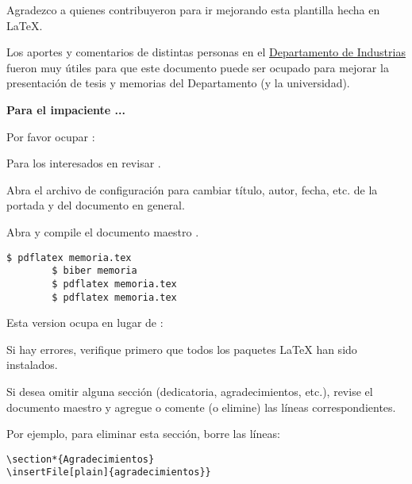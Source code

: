 
	Agradezco a quienes contribuyeron para ir mejorando esta plantilla hecha en \LaTeX{}. 
    
    Los aportes y comentarios de distintas personas en el \href{http://www.industrias.usm.cl}{Departamento de Industrias} fueron muy útiles para que este documento puede ser ocupado para mejorar la presentación de tesis y memorias del Departamento (y la universidad).
    
\vspace{20mm}
\begin{framed}
\noindent\textbf{\color{red}Para el impaciente ...}

Por favor ocupar :


Para los interesados en  revisar \parencite{Benoit2018}.

Abra el archivo de configuración  para cambiar título, autor, fecha, etc. de la portada y del documento en general.

Abra  y compile el documento maestro .

\begin{Verbatim}[fontsize=\small]
        $ pdflatex memoria.tex
        $ biber memoria
        $ pdflatex memoria.tex
        $ pdflatex memoria.tex
\end{Verbatim}

Esta version ocupa  en lugar de :

Si hay errores, verifique primero que todos los paquetes \LaTeX{} han sido instalados.

Si desea omitir alguna sección (dedicatoria, agradecimientos, etc.), revise el documento maestro  y agregue o comente (o elimine) las líneas correspondientes.

Por ejemplo, para eliminar esta sección, borre las líneas:

\begin{Verbatim}[frame=lines, label=\inlinecode{memoria.tex} (extracto)
, fontsize=\footnotesize
, baselinestretch=1
, formatcom=\color{gray}]
\section*{Agradecimientos}
\insertFile[plain]{agradecimientos}}
\end{Verbatim}
\end{framed}

